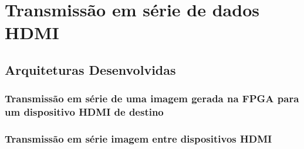 \chapter{Transmissão em série de dados HDMI} \label{chap:chap5}

%
%
%
%

\section{Arquiteturas Desenvolvidas}

\subsection{Transmissão em série de uma imagem gerada na FPGA para um dispositivo HDMI de destino}

\subsection{Transmissão em série imagem entre dispositivos HDMI}